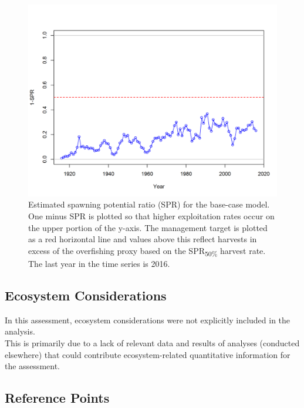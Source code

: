 \documentclass[12pt,]{article}
\begin{document}
\begin{figure}[htbp]
\centering
\includegraphics{r4ss/plots_mod1/SPR2_minusSPRseries.png}
\caption{Estimated spawning potential ratio (SPR) for the base-case
model. One minus SPR is plotted so that higher exploitation rates occur
on the upper portion of the y-axis. The management target is plotted as
a red horizontal line and values above this reflect harvests in excess
of the overfishing proxy based on the SPR\textsubscript{50\%} harvest
rate. The last year in the time series is 2016. \label{fig:SPR_all}}
\end{figure}

\FloatBarrier

\subsection*{Ecosystem Considerations}\label{ecosystem-considerations}

In this assessment, ecosystem considerations were not explicitly
included in the analysis.\\
This is primarily due to a lack of relevant data and results of analyses
(conducted elsewhere) that could contribute ecosystem-related
quantitative information for the assessment.

\subsection*{Reference Points}\label{reference-points}
\end{document}
